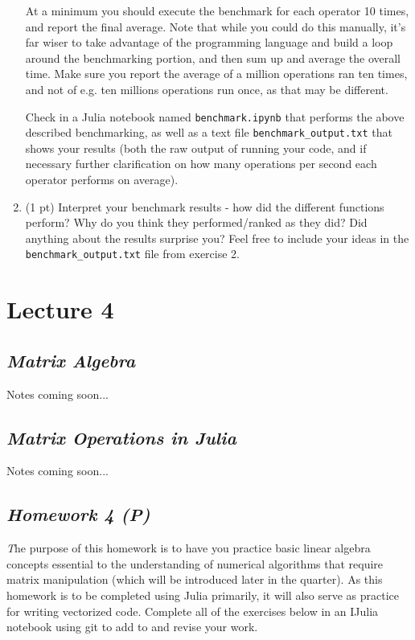 \documentclass[11pt,a4paper,oneside]{report}
\begin{document}
\begin{enumerate}
At a minimum you should execute the benchmark for each operator 10 times, and report the final average. Note that while you could do this manually, it's far wiser to take advantage of the programming language and build a loop around the benchmarking portion, and then sum up and average the overall time. Make sure you report the average of a million operations ran ten times, and not of e.g. ten millions operations run once, as that may be different.

Check in a Julia notebook named \verb+benchmark.ipynb+ that performs the above described benchmarking, as well as a text file \verb+benchmark_output.txt+ that shows your results (both the raw output of running your code, and if necessary further clarification on how many operations per second each operator performs on average).

\item {(1 pt)} Interpret your benchmark results - how did the different functions perform? Why do you think they performed/ranked as they did? Did anything about the results surprise you? Feel free to include your ideas in the \verb+benchmark_output.txt+ file from exercise 2.
\end{enumerate}



\newpage
\section*{Lecture 4}

{\center\color{magenta}
\subsection*{\it\huge Matrix Algebra}}
Notes coming soon...
{\center\color{magenta}
\subsection*{\it\huge Matrix Operations in Julia}}
Notes coming soon...
\pagebreak

{\center\color{magenta}
\subsection*{\it\huge Homework 4 (P)}}
{\it\huge T}he purpose of this homework is to have you practice basic linear algebra concepts essential to the understanding of numerical algorithms that require matrix manipulation (which will be introduced later in the quarter). As this homework is to be completed using Julia primarily, it will also serve as practice for writing vectorized code. Complete all of the exercises below in an IJulia notebook using git to add to and revise your work.\\
\end{document}
